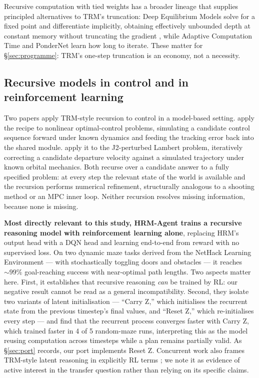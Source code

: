 \documentclass[11pt]{article}
\begin{document}
Recursive computation with tied weights has a broader lineage that supplies principled alternatives to TRM's truncation: Deep Equilibrium Models solve for a fixed point and differentiate implicitly, obtaining effectively unbounded depth at constant memory without truncating the gradient \citep{bai2019deq}, while Adaptive Computation Time \citep{graves2016act} and PonderNet \citep{banino2021pondernet} learn how long to iterate. These matter for \S\ref{sec:programme}: TRM's one-step truncation is an economy, not a necessity.

\subsection{Recursive models in control and in reinforcement learning}
\label{sec:recursivecontrol}

Two papers apply TRM-style recursion to control in a model-based setting. \citet{jainlinares2025trc} apply the recipe to nonlinear optimal-control problems, simulating a candidate control sequence forward under known dynamics and feeding the tracking error back into the shared module. \citet{wijayatunga2026trmpl} apply it to the J2-perturbed Lambert problem, iteratively correcting a candidate departure velocity against a simulated trajectory under known orbital mechanics. Both recurse over a candidate answer to a fully specified problem: at every step the relevant state of the world is available and the recursion performs numerical refinement, structurally analogous to a shooting method or an MPC inner loop. Neither recursion resolves missing information, because none is missing.

\textbf{Most directly relevant to this study, HRM-Agent \citep{dang2025hrmagent} trains a recursive reasoning model with reinforcement learning alone}, replacing HRM's output head with a DQN head and learning end-to-end from reward with no supervised loss. On two dynamic maze tasks derived from the NetHack Learning Environment --- with stochastically toggling doors and obstacles --- it reaches ${\sim}99\%$ goal-reaching success with near-optimal path lengths. Two aspects matter here. First, it establishes that recursive reasoning \emph{can} be trained by RL: our negative result cannot be read as a general incompatibility. Second, they isolate two variants of latent initialisation --- ``Carry Z,'' which initialises the recurrent state from the previous timestep's final values, and ``Reset Z,'' which re-initialises every step --- and find that the recurrent process converges faster with Carry Z, which trained faster in 4 of 5 random-maze runs, interpreting this as the model reusing computation across timesteps while a plan remains partially valid. As \S\ref{sec:port} records, our port implements Reset Z. Concurrent work also frames TRM-style latent reasoning in explicitly RL terms \citep{asadulaev2025latent}; we note it as evidence of active interest in the transfer question rather than relying on its specific claims.
\end{document}
